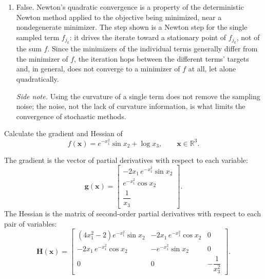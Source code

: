 \begin{solution}
\begin{enumerate}[label=(\alph*)]
        \emph{Side note.} The appeal of stochastic gradient descent is not its convergence rate but its per-iteration cost: each step touches only one term instead of all $M$.
        \item  False. Newton's quadratic convergence is a property of the deterministic Newton method applied to the objective being minimized, near a nondegenerate minimizer. The step shown is a Newton step for the single sampled term $f_{j_k}$: it drives the iterate toward a stationary point of $f_{j_k}$, not of the sum $f$. Since the minimizers of the individual terms generally differ from the minimizer of $f$, the iteration hops between the different terms' targets and, in general, does not converge to a minimizer of $f$ at all, let alone quadratically.

        \emph{Side note.} Using the curvature of a single term does not remove the sampling noise; the noise, not the lack of curvature information, is what limits the convergence of stochastic methods.
    \end{enumerate}
\end{solution}

\begin{exercise} %
    Calculate the gradient and Hessian of
    \[
        f(\mathbf{x}) = e^{-x_1^2}\sin x_2 + \log x_3, \qquad \mathbf{x}\in\mathbb{R}^3.
    \]
\end{exercise}

\begin{solution}
    The gradient is the vector of partial derivatives with respect to each variable:
    \[
        \mathbf{g}(\mathbf{x})
        = \begin{bmatrix}
            -2x_1\,e^{-x_1^2}\sin x_2 \\[4pt]
            e^{-x_1^2}\cos x_2 \\[4pt]
            \dfrac{1}{x_3}
        \end{bmatrix}.
    \]
    The Hessian is the matrix of second-order partial derivatives with respect to each pair of variables:
    \[
        \mathbf{H}(\mathbf{x})
        = \begin{bmatrix}
            (4x_1^2-2)e^{-x_1^2}\sin x_2 & -2x_1\,e^{-x_1^2}\cos x_2 & 0 \\[6pt]
            -2x_1\,e^{-x_1^2}\cos x_2      & -e^{-x_1^2}\sin x_2        & 0 \\[6pt]
            0 & 0 & -\dfrac{1}{x_3^2}
        \end{bmatrix}.
    \]
\end{solution}

